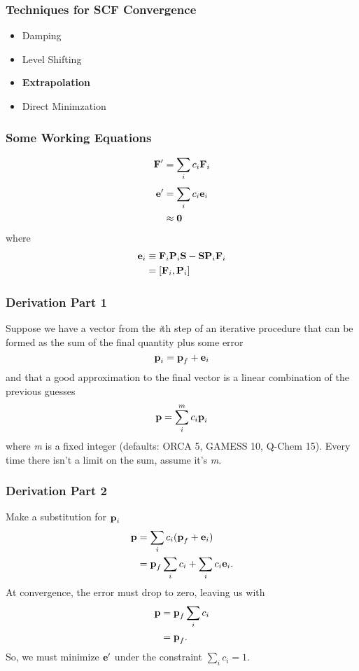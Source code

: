 \documentclass[10pt,compress,red]{beamer}
\begin{document}
\begin{frame}
  \frametitle{Techniques for SCF Convergence}
  \begin{itemize}
    \item Damping
    \item Level Shifting
    \item \textbf{Extrapolation}
    \item Direct Minimzation
  \end{itemize}
\end{frame}

\begin{frame}
  \frametitle{Some Working Equations}
  \begin{equation}
    \boldsymbol{\mathbf{F}}' = \sum_{i} c_{i} \boldsymbol{\mathbf{F}}_{i}
  \end{equation}
  \begin{align}
    \boldsymbol{\mathbf{e}}' &= \sum_{i} c_{i} \boldsymbol{\mathbf{e}}_{i} \\
    &\approx \boldsymbol{\mathbf{0}} \nonumber
  \end{align}
  where
  \begin{align}
    \boldsymbol{\mathbf{e}}_{i} &\equiv \boldsymbol{\mathbf{F}}_{i} \boldsymbol{\mathbf{P}}_{i} \boldsymbol{\mathbf{S}} - \boldsymbol{\mathbf{S}} \boldsymbol{\mathbf{P}}_{i} \boldsymbol{\mathbf{F}}_{i} \\
    &= [\boldsymbol{\mathbf{F}}_{i}, \boldsymbol{\mathbf{P}}_{i}]
  \end{align}
\end{frame}

\begin{frame}
  \frametitle{Derivation Part 1} Suppose we have a vector from
  the \textit{i}th step of an iterative procedure that can be formed
  as the sum of the final quantity plus some error
  \begin{equation}
    \boldsymbol{\mathbf{p}}_{i} = \boldsymbol{\mathbf{p}}_{f} + \boldsymbol{\mathbf{e}}_{i}
  \end{equation}
  and that a good approximation to the final vector is a linear
  combination of the previous guesses
  \begin{equation}
    \boldsymbol{\mathbf{p}} = \sum_{i}^{m} c_{i} \boldsymbol{\mathbf{p}}_{i}
  \end{equation}
  where \textit{m} is a fixed integer (defaults: ORCA 5, GAMESS 10,
  Q-Chem 15). Every time there isn't a limit on the sum, assume it's
  \textit{m}.
\end{frame}

\begin{frame}
  \frametitle{Derivation Part 2}
  Make a substitution for \(\boldsymbol{\mathbf{p}}_{i}\)
  \begin{align}
    \boldsymbol{\mathbf{p}} &= \sum_{i} c_{i} (\boldsymbol{\mathbf{p}}_{f} + \boldsymbol{\mathbf{e}}_{i}) \\
    &= \boldsymbol{\mathbf{p}}_{f} \sum_{i} c_{i} + \sum_{i} c_{i} \boldsymbol{\mathbf{e}}_{i}.
  \end{align}
  At convergence, the error must drop to zero, leaving us with
  \begin{align}
    \boldsymbol{\mathbf{p}} &= \boldsymbol{\mathbf{p}}_{f} \sum_{i} c_{i} \\
    &= \boldsymbol{\mathbf{p}}_{f}.
  \end{align}
  So, we must minimize \(\boldsymbol{\mathbf{e}}^{\prime}\) under the constraint
  \(\sum_{i} c_{i} = 1\).
\end{frame}
\end{document}
